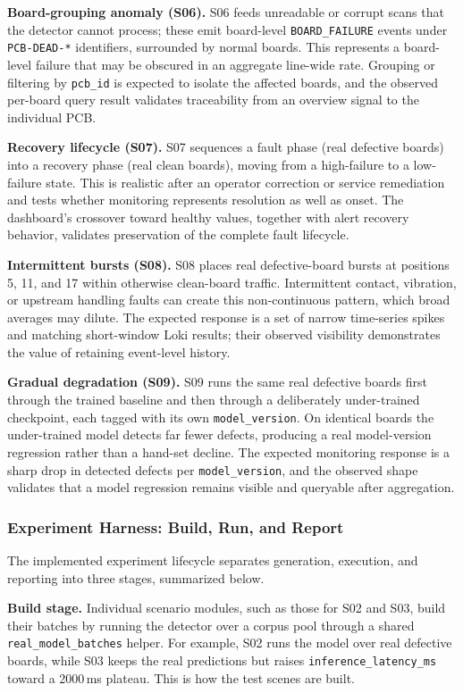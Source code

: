 \documentclass[12pt,a4paper]{article}
\begin{document}
\textbf{Board-grouping anomaly (S06).}
S06 feeds unreadable or corrupt scans that the detector cannot process; these
emit board-level \texttt{BOARD\_FAILURE} events under \texttt{PCB-DEAD-*}
identifiers, surrounded by normal boards. This represents a board-level failure
that may be obscured in an aggregate line-wide rate. Grouping or filtering by
\texttt{pcb\_id} is expected to isolate the affected boards, and the observed
per-board query result validates traceability from an overview signal to the
individual PCB.

\textbf{Recovery lifecycle (S07).}
S07 sequences a fault phase (real defective boards) into a recovery phase (real
clean boards), moving from a high-failure to a low-failure state. This is
realistic after an operator correction or service remediation and tests whether
monitoring represents resolution as well as onset. The dashboard's crossover toward
healthy values, together with alert recovery behavior, validates preservation
of the complete fault lifecycle.

\textbf{Intermittent bursts (S08).}
S08 places real defective-board bursts at positions 5, 11, and 17 within
otherwise clean-board traffic. Intermittent contact, vibration, or upstream
handling faults can create this non-continuous pattern, which broad averages
may dilute. The expected response is a set of narrow time-series spikes and
matching short-window Loki results; their observed visibility demonstrates the
value of retaining event-level history.

\textbf{Gradual degradation (S09).}
S09 runs the same real defective boards first through the trained baseline and
then through a deliberately under-trained checkpoint, each tagged with its own
\texttt{model\_version}. On identical boards the under-trained model detects far
fewer defects, producing a real model-version regression rather than a hand-set
decline. The expected monitoring response is a sharp drop in detected defects per
\texttt{model\_version}, and the observed shape validates that a model regression
remains visible and queryable after aggregation.

\subsubsection{Experiment Harness: Build, Run, and Report}
The implemented experiment lifecycle separates generation, execution, and
reporting into three stages, summarized below.

\textbf{Build stage.} Individual scenario modules, such as those for S02 and S03,
build their batches by running the detector over a corpus pool through a shared
\texttt{real\_model\_batches} helper. For example, S02 runs the model over real
defective boards, while S03 keeps the real predictions but raises
\texttt{inference\_latency\_ms} toward a 2000\,ms plateau. This is how the test
scenes are built.
\end{document}
